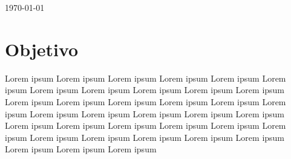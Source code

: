 \documentclass[12pt]{article}
\begin{document}

%

\vspace*{-4cm}%
\begin{flushright}
{\large \today}	
\end{flushright}











\newpage
\tableofcontents



\newpage

\newpage
\newpage																		



\section{Objetivo}



Lorem ipsum Lorem ipsum Lorem ipsum Lorem ipsum Lorem ipsum Lorem ipsum Lorem ipsum Lorem ipsum Lorem ipsum Lorem ipsum Lorem ipsum Lorem ipsum Lorem ipsum Lorem ipsum Lorem ipsum Lorem ipsum Lorem ipsum Lorem ipsum Lorem ipsum Lorem ipsum Lorem ipsum Lorem ipsum Lorem ipsum Lorem ipsum Lorem ipsum Lorem ipsum Lorem ipsum Lorem ipsum Lorem ipsum Lorem ipsum Lorem ipsum Lorem ipsum Lorem ipsum Lorem ipsum Lorem ipsum Lorem ipsum\cite{IEEEreferencias:Ref1}
\end{document}
